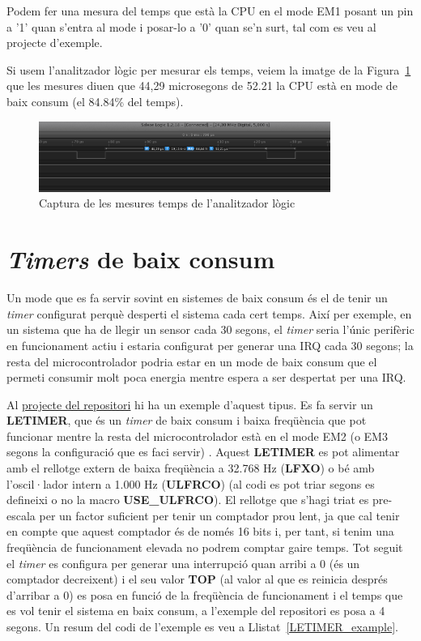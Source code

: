 Podem fer una mesura del temps que està la CPU en el mode EM1 posant un pin a '1' quan s'entra al mode i posar-lo a '0' quan se'n surt, tal com es veu al projecte d'exemple.

Si usem l'analitzador lògic per mesurar els temps, veiem la imatge de la Figura~\ref{fig:adc_logic} que les mesures diuen que 44,29 microsegons de 52.21 la CPU està en mode de baix consum (el 84.84\% del temps).

\begin{figure}
 \centering
 \includegraphics[width=0.85\textwidth, keepaspectratio]{imatges/ADC_LP1_Measurement.png}
 \caption{Captura de les mesures temps de l'analitzador lògic}
 \label{fig:adc_logic}
\end{figure}

\section{{\em Timers} de baix consum}
\label{sub:letimer_example}
Un mode que es fa servir sovint en sistemes de baix consum és el de tenir un {\em timer} configurat perquè desperti el sistema cada cert temps. Així per exemple, en un sistema que ha de llegir un sensor cada 30 segons, el {\em timer} seria l'únic perifèric en funcionament actiu i estaria configurat per generar una \gls{IRQ} cada 30 segons; la resta del microcontrolador podria estar en un mode de baix consum que el permeti consumir molt poca energia mentre espera a ser despertat per una \gls{IRQ}.

Al \href{https://github.com/mariusmm/cursembedded/tree/master/Simplicity/LETIMER_LP}{projecte del repositori} hi ha un exemple d'aquest tipus. Es fa servir un {\bf LETIMER}, que és un {\em timer} de baix consum i baixa freqüència que pot funcionar mentre la resta del microcontrolador està en el mode EM2 (o EM3 segons la configuració que es faci servir) \cite[294]{EFM32TGRM}. Aquest {\bf LETIMER} es pot alimentar amb el rellotge extern de baixa freqüència a 32.768 Hz ({\bf LFXO}) o bé amb l'oscil·lador intern a 1.000 Hz ({\bf ULFRCO}) (al codi es pot triar segons es defineixi o no la macro {\bf USE\_ULFRCO}). El rellotge que s'hagi triat es pre-escala per un factor suficient per tenir un comptador prou lent, ja que cal tenir en compte que aquest comptador és de només 16 bits i, per tant, si tenim una freqüència de funcionament elevada no podrem comptar gaire temps.
Tot seguit el {\em timer} es configura per generar una interrupció quan arribi a 0 (és un comptador decreixent) i el seu valor {\bf TOP} (al valor al que es reinicia després d'arribar a 0) es posa en funció de la freqüència de funcionament i el temps que es vol tenir el sistema en baix consum, a l'exemple del repositori es posa a 4 segons. Un resum del codi de l'exemple es veu a Llistat~\ref{LETIMER_example}.

